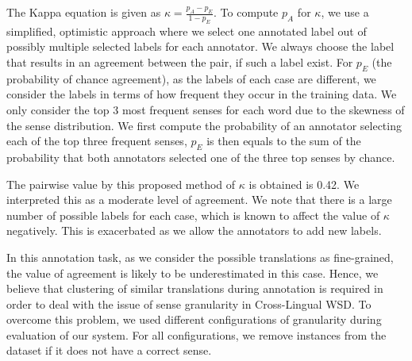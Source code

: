The Kappa equation is given as 
$\kappa = \frac{p_A - p_E}{1 - p_E} $.
To compute $p_A$ for $\kappa$, we use a simplified, optimistic approach where we select one annotated label out of possibly multiple selected labels for each annotator. We always choose the label that results in an agreement between the pair, if such a label exist. For $p_E$ (the probability of chance agreement), as the labels of each case are different, we consider the labels in terms of how frequent they occur in the training data. 
We only consider the top 3 most frequent senses for each word %
due to the skewness of the sense distribution. 
We first compute the probability of an annotator selecting each of the top three frequent senses, $p_E$ is then equals to the sum of the probability that both annotators selected one of the three top senses by chance. 

The pairwise value by this proposed method of $\kappa$ is obtained is 0.42. We interpreted this as a moderate level of agreement. We note that there is a large number of possible labels for each case, which is known to affect the value of $\kappa$ negatively. This is exacerbated as we allow the annotators to add new labels. 


In this annotation task, as we consider the possible translations as  fine-grained, the value of agreement is likely to be underestimated in this case. Hence, we believe that clustering of similar translations during annotation is required in order to deal with the issue of sense granularity in Cross-Lingual WSD. 
To overcome this problem, we used different configurations of granularity during evaluation of our system. 
For all configurations,
we remove instances from the dataset if it does not have a correct sense. 

